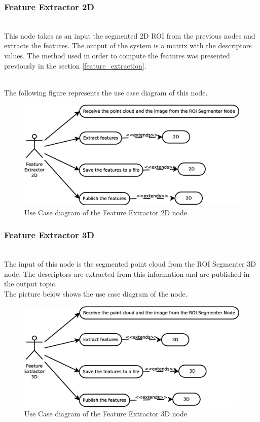 \subsubsection{Feature Extractor 2D}\\
	This node takes as an input the segmented 2D ROI from the previous nodes and extracts the features. The output of the system is a matrix with the descriptors values. The method used in order to compute the features was presented previously in the section  \ref{feature_extraction}.

	\\

	The following figure represents the use case diagram of this node. 
	\begin{figure}[H]
		\centering
			\includegraphics[scale=0.4]{img/diagrams/uc_feature_extractor_2d.eps}
			\caption[Use case diagram Feature Extractor 2D node]{Use Case diagram of the Feature Extractor 2D node}
		
	\end{figure}

\subsubsection{Feature Extractor 3D}\\
	The input of this node is the segmented point cloud from the ROI Segmenter 3D node. The descriptors are extracted from this information and are published in the output topic. 
	\\

	The picture below shows the use case diagram of the node. 

	\begin{figure}[H]
		\centering
			\includegraphics[scale=0.4]{img/diagrams/uc_feature_extractor_3d.eps}
			\caption[Use case diagram Feature Extractor 3D node]{Use Case diagram of the Feature Extractor 3D node}
		
	\end{figure}

